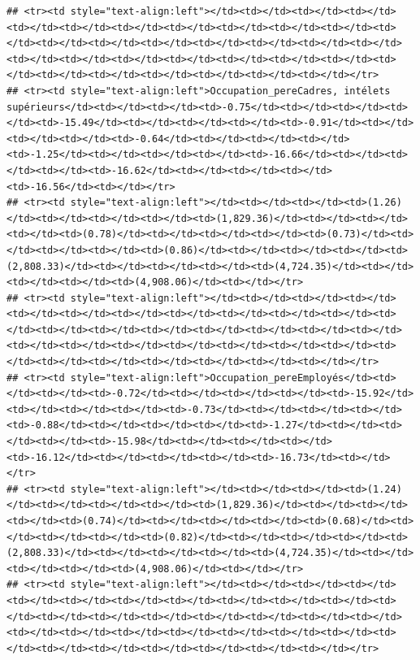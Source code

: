 \documentclass[
]{article}
\begin{document}
\begin{verbatim}
## <tr><td style="text-align:left"></td><td></td><td></td><td></td><td></td><td></td><td></td><td></td><td></td><td></td><td></td><td></td><td></td><td></td><td></td><td></td><td></td><td></td><td></td><td></td><td></td><td></td><td></td><td></td><td></td><td></td><td></td><td></td><td></td><td></td><td></td><td></td><td></td></tr>
## <tr><td style="text-align:left">Occupation_pereCadres, intélets supérieurs</td><td></td><td></td><td>-0.75</td><td></td><td></td><td></td><td>-15.49</td><td></td><td></td><td></td><td>-0.91</td><td></td><td></td><td></td><td>-0.64</td><td></td><td></td><td></td><td>-1.25</td><td></td><td></td><td></td><td>-16.66</td><td></td><td></td><td></td><td>-16.62</td><td></td><td></td><td></td><td>-16.56</td><td></td></tr>
## <tr><td style="text-align:left"></td><td></td><td></td><td>(1.26)</td><td></td><td></td><td></td><td>(1,829.36)</td><td></td><td></td><td></td><td>(0.78)</td><td></td><td></td><td></td><td>(0.73)</td><td></td><td></td><td></td><td>(0.86)</td><td></td><td></td><td></td><td>(2,808.33)</td><td></td><td></td><td></td><td>(4,724.35)</td><td></td><td></td><td></td><td>(4,908.06)</td><td></td></tr>
## <tr><td style="text-align:left"></td><td></td><td></td><td></td><td></td><td></td><td></td><td></td><td></td><td></td><td></td><td></td><td></td><td></td><td></td><td></td><td></td><td></td><td></td><td></td><td></td><td></td><td></td><td></td><td></td><td></td><td></td><td></td><td></td><td></td><td></td><td></td><td></td></tr>
## <tr><td style="text-align:left">Occupation_pereEmployés</td><td></td><td></td><td>-0.72</td><td></td><td></td><td></td><td>-15.92</td><td></td><td></td><td></td><td>-0.73</td><td></td><td></td><td></td><td>-0.88</td><td></td><td></td><td></td><td>-1.27</td><td></td><td></td><td></td><td>-15.98</td><td></td><td></td><td></td><td>-16.12</td><td></td><td></td><td></td><td>-16.73</td><td></td></tr>
## <tr><td style="text-align:left"></td><td></td><td></td><td>(1.24)</td><td></td><td></td><td></td><td>(1,829.36)</td><td></td><td></td><td></td><td>(0.74)</td><td></td><td></td><td></td><td>(0.68)</td><td></td><td></td><td></td><td>(0.82)</td><td></td><td></td><td></td><td>(2,808.33)</td><td></td><td></td><td></td><td>(4,724.35)</td><td></td><td></td><td></td><td>(4,908.06)</td><td></td></tr>
## <tr><td style="text-align:left"></td><td></td><td></td><td></td><td></td><td></td><td></td><td></td><td></td><td></td><td></td><td></td><td></td><td></td><td></td><td></td><td></td><td></td><td></td><td></td><td></td><td></td><td></td><td></td><td></td><td></td><td></td><td></td><td></td><td></td><td></td><td></td><td></td></tr>

\end{verbatim}
\end{document}
